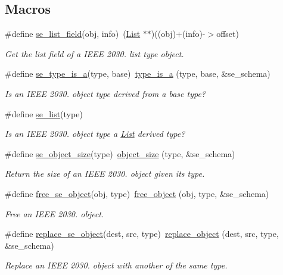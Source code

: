 \subsection*{Macros}
\begin{DoxyCompactItemize}
\item 
\#define \hyperlink{group__se__object_gad1c4836517f639b152ab8cc59f2b7804}{se\+\_\+list\+\_\+field}(obj,  info)~(\hyperlink{structList}{List} $\ast$$\ast$)((obj)+(info)-\/$>$offset)
\begin{DoxyCompactList}\small\item\em Get the list field of a I\+E\+EE 2030. list type object. \end{DoxyCompactList}\item 
\#define \hyperlink{group__se__object_ga6a18ca73ed2f7d19fe79cf78283e9f2c}{se\+\_\+type\+\_\+is\+\_\+a}(type,  base)~\hyperlink{group__schema_ga16de35ef559b5cc37cf33dd647ceb366}{type\+\_\+is\+\_\+a} (type, base, \&se\+\_\+schema)
\begin{DoxyCompactList}\small\item\em Is an I\+E\+EE 2030. object type derived from a base type? \end{DoxyCompactList}\item 
\#define \hyperlink{group__se__object_ga6434555a70cf68b6665831c6e241d86f}{se\+\_\+list}(type)
\begin{DoxyCompactList}\small\item\em Is an I\+E\+EE 2030. object type a \hyperlink{structList}{List} derived type? \end{DoxyCompactList}\item 
\#define \hyperlink{group__se__object_ga8e501f611d4bebae2149ca3fdd8cd930}{se\+\_\+object\+\_\+size}(type)~\hyperlink{group__schema_ga4c9e71b8c2112dfc32414022942618de}{object\+\_\+size} (type, \&se\+\_\+schema)
\begin{DoxyCompactList}\small\item\em Return the size of an I\+E\+EE 2030. object given its type. \end{DoxyCompactList}\item 
\#define \hyperlink{group__se__object_gab24b84e0b8b364115f5b5af19a9860a2}{free\+\_\+se\+\_\+object}(obj,  type)~\hyperlink{group__schema_gaff2eea92a7727eb0f66bfa00ab05b080}{free\+\_\+object} (obj, type, \&se\+\_\+schema)
\begin{DoxyCompactList}\small\item\em Free an I\+E\+EE 2030. object. \end{DoxyCompactList}\item 
\#define \hyperlink{group__se__object_ga31d6d3800c0c415a852faaa5f41b3afe}{replace\+\_\+se\+\_\+object}(dest,  src,  type)~\hyperlink{group__schema_gadec1b0417cb8f2c7ee7075d5be5e09c1}{replace\+\_\+object} (dest, src, type, \&se\+\_\+schema)
\begin{DoxyCompactList}\small\item\em Replace an I\+E\+EE 2030. object with another of the same type. \end{DoxyCompactList}\end{DoxyCompactItemize}
